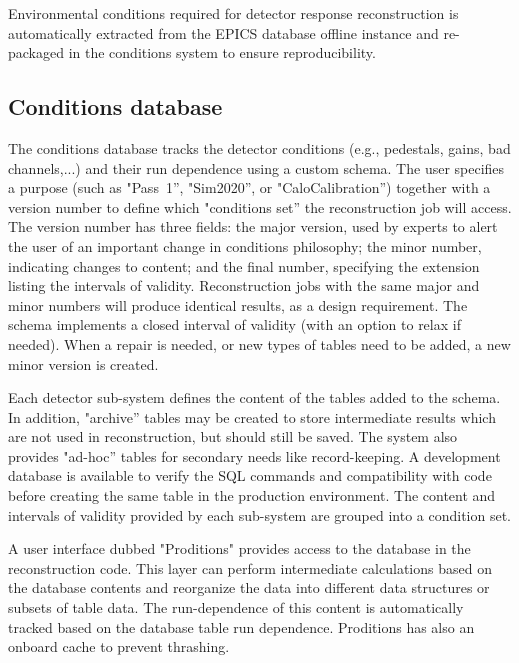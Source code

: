 Environmental conditions required for detector response reconstruction is automatically extracted from the EPICS database offline instance and re-packaged in the conditions system to ensure reproducibility.


\subsection{Conditions database} 
The conditions database tracks the detector conditions (e.g., pedestals, gains, bad channels,...) and their run dependence using a custom schema. The user specifies a purpose (such as "Pass~1'', "Sim2020'', or "CaloCalibration'') together with a version number to define which "conditions set'' the reconstruction job will access. The version number has three fields: the major version, used by experts to alert the user of an important change in conditions philosophy; the minor number,  indicating changes to content; and the final number, specifying the extension listing the intervals of validity. Reconstruction jobs with the same major and minor numbers will produce identical results, as a design requirement. The schema implements a closed interval of validity (with an option to relax if needed). When a repair is needed, or new types of tables need to be added, a new minor version is created.

Each detector sub-system defines the content of the tables added to the schema. In addition, "archive'' tables may be created to store intermediate results which are not used in reconstruction, but should still be saved. The system also provides "ad-hoc'' tables for secondary needs like record-keeping. A development database is available to verify the SQL commands and compatibility with code before creating the same table in the production environment. The content and intervals of validity provided by each sub-system are grouped into a condition set. 

A user interface dubbed "Proditions" provides access to the database in the reconstruction code. This layer can perform intermediate calculations based on the database contents and reorganize the data into different data structures or subsets of table data. The run-dependence of this content is automatically tracked based on the database table run dependence. Proditions has also an onboard cache to prevent thrashing.

